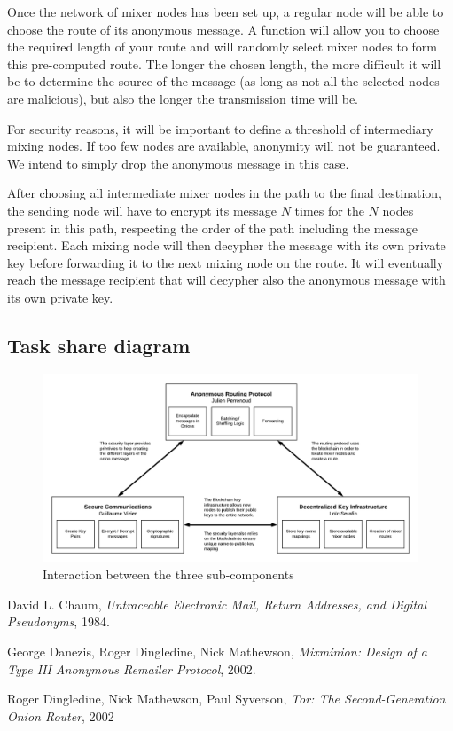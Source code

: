 \documentclass[11pt, a4paper]{article}
\begin{document}
            Once the network of mixer nodes has been set up, a regular node will be able to choose the route of its anonymous message.
            A function will allow you to choose the required length of your route and will randomly select mixer nodes to form this pre-computed route.
            The longer the chosen length, the more difficult it will be to determine the source of the message (as long as not all the selected nodes are malicious), but also the longer the transmission time will be.

            For security reasons, it will be important to define a threshold of intermediary mixing nodes.
            If too few nodes are available, anonymity will not be guaranteed.
            We intend to simply drop the anonymous message in this case.

            After choosing all intermediate mixer nodes in the path to the final destination, the sending node will have to encrypt its message $N$ times for the $N$ nodes present in this path, respecting the order of the path including the message recipient.
            Each mixing node will then decypher the message with its own private key before forwarding it to the next mixing node on the route.
            It will eventually reach the message recipient that will decypher also the anonymous message with its own private key.

    \subsection{Task share diagram}


\begin{figure}[h!]
  \includegraphics[width=\linewidth]{DSE Diagram.png}
  \caption{Interaction between the three sub-components}
  \label{fig:taskdiagram}
\end{figure}


\begin{thebibliography}{9}

  David L. Chaum,
  \textit{Untraceable Electronic Mail, Return Addresses, and Digital Pseudonyms},
  1984.

  George Danezis, Roger Dingledine, Nick Mathewson,
  \textit{Mixminion: Design of a Type III Anonymous Remailer Protocol},
  2002.

    Roger Dingledine, Nick Mathewson, Paul Syverson,
    \textit{Tor: The Second-Generation Onion Router},
    2002

\end{thebibliography}
\end{document}
